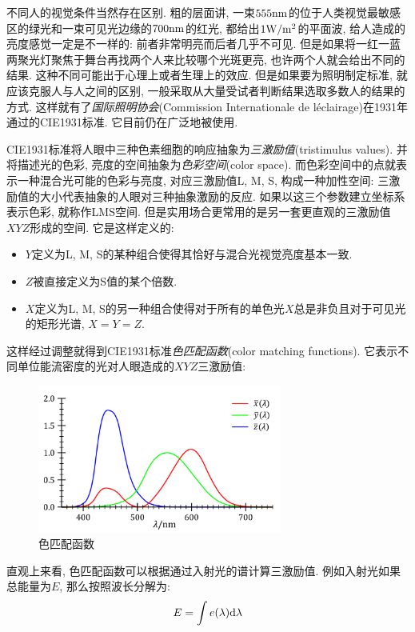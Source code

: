 不同人的视觉条件当然存在区别. 粗的层面讲, 一束$555{\rm nm}$的位于人类视觉最敏感区的绿光和一束可见光边缘的$700{\rm nm}$的红光, 都给出$1{\rm W/m^2}$的平面波, 给人造成的亮度感觉一定是不一样的: 前者非常明亮而后者几乎不可见. 但是如果将一红一蓝两聚光灯聚焦于舞台再找两个人来比较哪个光斑更亮, 也许两个人就会给出不同的结果. 这种不同可能出于心理上或者生理上的效应. 但是如果要为照明制定标准, 就应该克服人与人之间的区别, 一般采取从大量受试者判断结果选取多数人的结果的方式. 这样就有了\emph{国际照明协会}(Commission Internationale de l\ap\'eclairage)在1931年通过的CIE1931标准. 它目前仍在广泛地被使用.

CIE1931标准将人眼中三种色素细胞的响应抽象为\emph{三激励值}(tristimulus values). 并将描述光的色彩, 亮度的空间抽象为\emph{色彩空间}(color space). 而色彩空间中的点就表示一种混合光可能的色彩与亮度, 对应三激励值L, M, S, 构成一种加性空间: 三激励值的大小代表抽象的人眼对三种抽象激励的反应. 如果以这三个参数建立坐标系表示色彩, 就称作LMS空间. 但是实用场合更常用的是另一套更直观的三激励值$XYZ$形成的空间. 它是这样定义的:

\begin{itemize}
\item $Y$定义为L, M, S的某种组合使得其恰好与混合光视觉亮度基本一致.
\item $Z$被直接定义为S值的某个倍数.
\item $X$定义为L, M, S的另一种组合使得对于所有的单色光$X$总是非负且对于可见光的矩形光谱, $X=Y=Z$.
\end{itemize}

这样经过调整就得到CIE1931标准\emph{色匹配函数}(color matching functions). 它表示不同单位能流密度的光对人眼造成的$XYZ$三激励值:

\begin{figure}
\vspace{-0.1cm}
\centering
\includegraphics[width=8cm]{image/5-8-3.png}
\caption{色匹配函数}\label{fig:colormatch}
\end{figure}
直观上来看, 色匹配函数可以根据通过入射光的谱计算三激励值. 例如入射光如果总能量为$E$, 那么按照波长分解为:
\[E=\int e(\lambda)\textrm{d} \lambda\]

